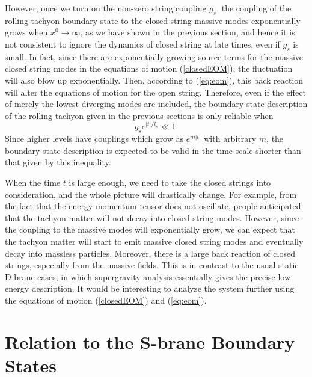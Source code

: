 \documentclass[a4paper,12pt]{article} \textheight=8.5truein
\newcommand{\ra}{\rightarrow}
\begin{document}
However, once we turn on the non-zero string coupling $g_s$, the
coupling of the rolling tachyon boundary state to the closed
string massive modes exponentially grows when $x^0 \ra \infty$, as
we have shown in the previous section, and hence it is not
consistent to ignore the dynamics of closed string at late times,
even if $g_s$ is small. In fact, since there are exponentially
growing source terms for the massive closed string modes in the
equations of motion (\ref{closedEOM}), the fluctuation will also
blow up exponentially. Then, according to (\ref{eq:eom}), this
back reaction will alter the equations of motion for the open
string. Therefore, even if the effect of merely the lowest diverging
modes are included, the boundary state description of the rolling
tachyon given in the previous sections is only reliable when
\begin{equation}
  \label{eq:validity}
  g_s e^{|t|/l_s} \ll 1.
\end{equation}
Since higher levels have couplings which grow as $e^{m|t|}$ with
arbitrary $m$, the boundary state description is expected to be
valid in the time-scale shorter than that given by this
inequality.

When the time $t$ is large enough, we need to take the closed
strings into consideration, and the whole picture will drastically
change. For example, from the fact that the energy momentum tensor
does not oscillate, people anticipated that the tachyon matter
will not decay into closed string modes. However, since the
coupling to the massive modes will exponentially grow, we can
expect that the tachyon matter will start to emit massive closed
string modes and eventually decay into massless particles.
Moreover, there is a large back reaction of closed strings,
especially from the massive fields. This is in contrast to the
usual static D-brane cases, in which supergravity analysis
essentially gives the precise low energy description. It would be
interesting to analyze the system further using the equations of
motion (\ref{closedEOM}) and (\ref{eq:eom}).



\section{Relation to the S-brane Boundary States} \label{s-brane}
\end{document}
